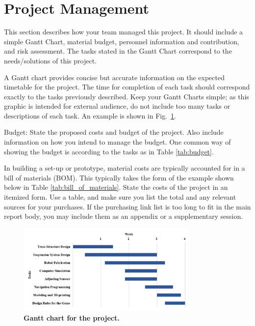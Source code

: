 \documentclass{engr1000j-s2}
\begin{document}
  \hspace{1em}

  \section{Project Management}

  This section describes how your team managed this project. It should include a
  simple Gantt Chart, material budget, personnel information and contribution,
  and risk assessment. The tasks stated in the Gantt Chart correspond to the needs/solutions
  of this project.

  A Gantt chart provides concise but accurate information on the expected timetable
  for the project. The time for completion of each task should correspond
  exactly to the tasks previously described. Keep your Gantt Charts simple; as
  this graphic is intended for external audience, do not include too many tasks or
  descriptions of each task. An example is shown in Fig.~\ref{fig:gantt_chart}.

  Budget: State the proposed costs and budget of the project. Also include information
  on how you intend to manage the budget. One common way of showing the budget
  is according to the tasks as in Table \ref{tab:budget}.

  In building a set-up or prototype, material costs are typically accounted for in
  a bill of materials (BOM). This typically takes the form of the example shown
  below in Table \ref{tab:bill_of_materials}. State the costs of the project in an
  itemized form. Use a table, and make sure you list the total and any relevant sources
  for your purchases. If the purchasing link list is too long to fit in the main
  report body, you may include them as an appendix or a supplementary session.

  \begin{figure}[H]
    \centering
    \includegraphics[width=0.8\textwidth]{figures/gantt_chart.png}
    \caption{\quad \textbf{Gantt chart for the project.}}
    \label{fig:gantt_chart}
  \end{figure}
\end{document}
